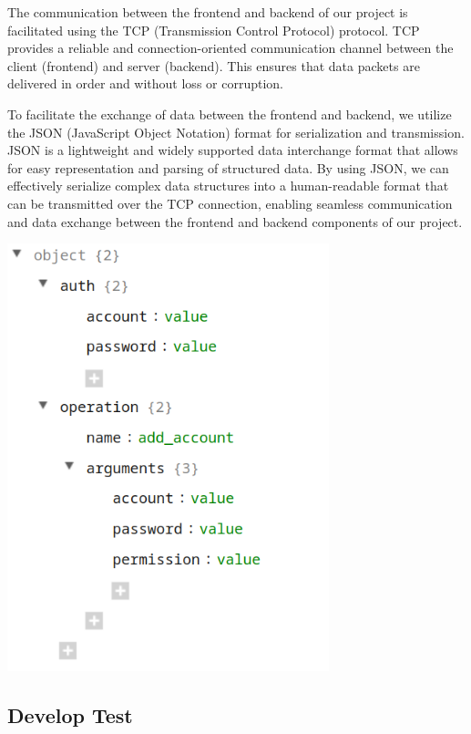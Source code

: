 {The communication between the frontend and backend of our project is
facilitated using the TCP (Transmission Control Protocol) protocol. TCP
provides a reliable and connection-oriented communication channel
between the client (frontend) and server (backend). This ensures that
data packets are delivered in order and without loss or corruption.

To facilitate the exchange of data between the frontend and backend, we
utilize the JSON (JavaScript Object Notation) format for serialization
and transmission. JSON is a lightweight and widely supported data
interchange format that allows for easy representation and parsing of
structured data. By using JSON, we can effectively serialize complex
data structures into a human-readable format that can be transmitted
over the TCP connection, enabling seamless communication and data
exchange between the frontend and backend components of our project.

\begin{center}
  \centering
  \includegraphics[width=0.7\textwidth]{pics/4.png}
\end{center}

\hypertarget{develop-test}{%
\subsection{Develop Test}\label{develop-test}}

}
